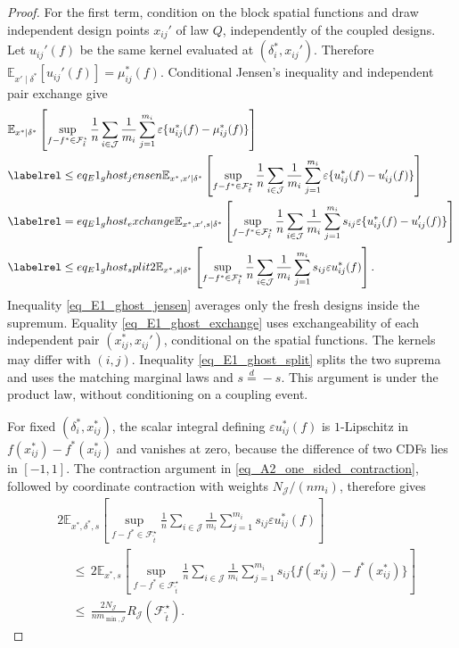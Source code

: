 \documentclass[twoside,11pt]{article}
\newenvironment{revision}{\color{revisionred}}{}
\begin{document}
\begin{revision}
\begin{proof}
For the first term, condition on the block spatial functions and
draw independent design points $x_{ij}'$ of law $Q$, independently of
the coupled designs. Let $u_{ij}'(f)$ be the same kernel evaluated
at $(\delta_i^*,x_{ij}')$. Therefore
$\mathbb E_{x'\mid\delta^*}[u_{ij}'(f)]=\mu_{ij}^*(f)$.
Conditional Jensen's inequality and independent pair exchange give
\begin{align*}
&\mathbb E_{x^*\mid\delta^*}\left[
\sup_{f-f^*\in\mathcal F_{\tilde t}^{\star}}
\frac1n\sum_{i\in\mathcal J}\frac1{m_i}\sum_{j=1}^{m_i}
\varepsilon\{u_{ij}^*(f)-\mu_{ij}^*(f)\}\right]\\
&\labelrel\leq{eq_E1_ghost_jensen}
\mathbb E_{x^*,x'\mid\delta^*}\left[
\sup_{f-f^*\in\mathcal F_{\tilde t}^{\star}}
\frac1n\sum_{i\in\mathcal J}\frac1{m_i}\sum_{j=1}^{m_i}
\varepsilon\{u_{ij}^*(f)-u_{ij}'(f)\}\right]\\
&\labelrel={eq_E1_ghost_exchange}
\mathbb E_{x^*,x',s\mid\delta^*}\left[
\sup_{f-f^*\in\mathcal F_{\tilde t}^{\star}}
\frac1n\sum_{i\in\mathcal J}\frac1{m_i}\sum_{j=1}^{m_i}
s_{ij}\varepsilon\{u_{ij}^*(f)-u_{ij}'(f)\}\right]\\
&\labelrel\leq{eq_E1_ghost_split}
2\mathbb E_{x^*,s\mid\delta^*}\left[
\sup_{f-f^*\in\mathcal F_{\tilde t}^{\star}}
\frac1n\sum_{i\in\mathcal J}\frac1{m_i}\sum_{j=1}^{m_i}
s_{ij}\varepsilon u_{ij}^*(f)\right].
\end{align*}
Inequality \eqref{eq_E1_ghost_jensen} averages only the fresh
designs inside the supremum. Equality \eqref{eq_E1_ghost_exchange}
uses exchangeability of each independent pair $(x_{ij}^*,x_{ij}')$,
conditional on the spatial functions. The kernels may differ with
$(i,j)$. Inequality \eqref{eq_E1_ghost_split} splits the two
suprema and uses the matching marginal laws and $s\stackrel d=-s$.
This argument is under the product law, without conditioning on a
coupling event.

For fixed $(\delta_i^*,x_{ij}^*)$, the scalar integral defining
$\varepsilon u_{ij}^*(f)$ is $1$-Lipschitz in
$f(x_{ij}^*)-f^*(x_{ij}^*)$ and vanishes at zero, because the
difference of two CDFs lies in $[-1,1]$. The contraction argument
in \eqref{eq_A2_one_sided_contraction}, followed by coordinate
contraction with weights $N_{\mathcal J}/(nm_i)$, therefore gives
\begin{align*}
&2\mathbb E_{x^*,\delta^*,s}\left[
\sup_{f-f^*\in\mathcal F_{\tilde t}^{\star}}
\frac1n\sum_{i\in\mathcal J}\frac1{m_i}\sum_{j=1}^{m_i}
s_{ij}\varepsilon u_{ij}^*(f)\right]\\
&\quad\,\leq\,
2\mathbb E_{x^*,s}\left[
\sup_{f-f^*\in\mathcal F_{\tilde t}^{\star}}
\frac1n\sum_{i\in\mathcal J}\frac1{m_i}\sum_{j=1}^{m_i}
s_{ij}\{f(x_{ij}^*)-f^*(x_{ij}^*)\}\right]\\
&\quad\,\leq\,\frac{2N_{\mathcal J}}{n m_{\min,\mathcal J}}
R_{\mathcal J}(\mathcal F_{\tilde t}^{\star}).
\end{align*}


\end{proof}
\end{revision}
\end{document}
